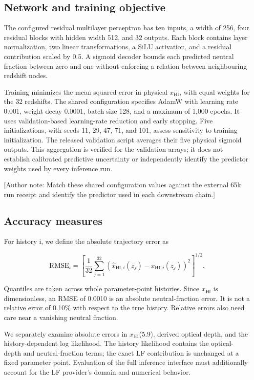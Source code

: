 \subsection{Network and training objective}\label{network-and-training-objective}

The configured residual multilayer perceptron has ten inputs, a width of 256, four residual blocks with hidden width 512, and 32 outputs. Each block contains layer normalization, two linear transformations, a SiLU activation, and a residual contribution scaled by 0.5. A sigmoid decoder bounds each predicted neutral fraction between zero and one without enforcing a relation between neighbouring redshift nodes.

Training minimizes the mean squared error in physical \ensuremath{x_{\mathrm{HI}}}, with equal weights for the 32 redshifts. The shared configuration specifies AdamW with learning rate 0.001, weight decay 0.0001, batch size 128, and a maximum of 1,000 epochs. It uses validation-based learning-rate reduction and early stopping. Five initializations, with seeds 11, 29, 47, 71, and 101, assess sensitivity to training initialization. The released validation script averages their five physical sigmoid outputs. This aggregation is verified for the validation arrays; it does not establish calibrated predictive uncertainty or independently identify the predictor weights used by every inference run.

{[}Author note: Match these shared configuration values against the external 65k run receipt and identify the predictor used in each downstream chain.{]}

\subsection{Accuracy measures}\label{accuracy-measures}

For history i, we define the absolute trajectory error as

\[
\mathrm{RMSE}_i=\left[\frac{1}{32}\sum_{j=1}^{32}
\left(\widehat{x}_{\mathrm{HI},i}(z_j)-x_{\mathrm{HI},i}(z_j)\right)^2\right]^{1/2}.
\]

Quantiles are taken across whole parameter-point histories. Since \ensuremath{x_{\mathrm{HI}}} is dimensionless, an RMSE of 0.0010 is an absolute neutral-fraction error. It is not a relative error of 0.10\% with respect to the true history. Relative errors also need care near a vanishing neutral fraction.

We separately examine absolute errors in \ensuremath{x_{\mathrm{HI}}}(5.9), derived optical depth, and the history-dependent log likelihood. The history likelihood contains the optical-depth and neutral-fraction terms; the exact LF contribution is unchanged at a fixed parameter point. Evaluation of the full inference interface must additionally account for the LF provider's domain and numerical behavior.

